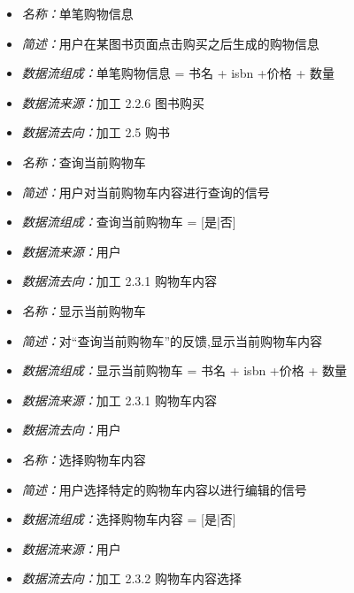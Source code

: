 \documentclass{article}
\begin{document}
\begin{CJK*}{UTF8}{gbsn}
\vspace{-1mm}

\begin{itemize}
	\item \textit{名称：}单笔购物信息
	\item \textit{简述：}用户在某图书页面点击购买之后生成的购物信息
	\item \textit{数据流组成：}单笔购物信息 = 书名 + isbn +价格 + 数量
	\item \textit{数据流来源：}加工 2.2.6 图书购买
	\item \textit{数据流去向：}加工 2.5 购书
\end{itemize}

\vspace{-1mm}

\begin{itemize}
	\item \textit{名称：}查询当前购物车
	\item \textit{简述：}用户对当前购物车内容进行查询的信号
	\item \textit{数据流组成：}查询当前购物车 = [是|否]
	\item \textit{数据流来源：}用户
	\item \textit{数据流去向：}加工 2.3.1 购物车内容
\end{itemize}

\vspace{-1mm}

\begin{itemize}
	\item \textit{名称：}显示当前购物车
	\item \textit{简述：}对“查询当前购物车”的反馈,显示当前购物车内容
	\item \textit{数据流组成：}显示当前购物车 = 书名 + isbn +价格 + 数量
	\item \textit{数据流来源：}加工 2.3.1 购物车内容
	\item \textit{数据流去向：}用户
\end{itemize}

\vspace{-1mm}

\begin{itemize}
	\item \textit{名称：}选择购物车内容
	\item \textit{简述：}用户选择特定的购物车内容以进行编辑的信号
	\item \textit{数据流组成：}选择购物车内容 = [是|否]
	\item \textit{数据流来源：}用户
	\item \textit{数据流去向：}加工 2.3.2 购物车内容选择
\end{itemize}


\end{CJK*}
\end{document}
